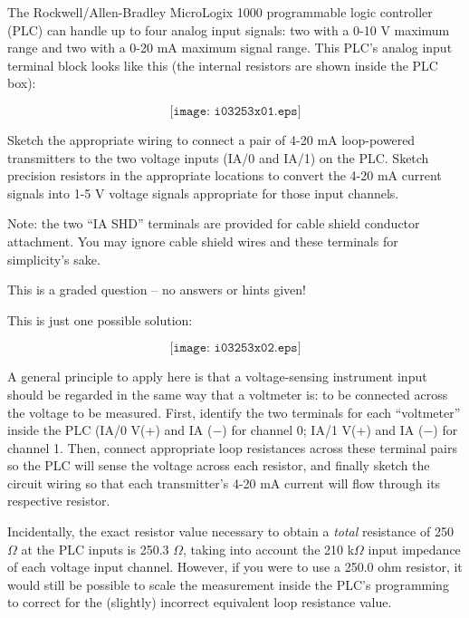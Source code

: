 

The Rockwell/Allen-Bradley MicroLogix 1000 programmable logic controller (PLC) can handle up to four analog input signals: two with a 0-10 V maximum range and two with a 0-20 mA maximum signal range.  This PLC's analog input terminal block looks like this (the internal resistors are shown inside the PLC box):

$$\texttt{[image: i03253x01.eps]}$$

Sketch the appropriate wiring to connect a pair of 4-20 mA loop-powered transmitters to the two voltage inputs (IA/0 and IA/1) on the PLC.  Sketch precision resistors in the appropriate locations to convert the 4-20 mA current signals into 1-5 V voltage signals appropriate for those input channels.

\vfil 

Note: the two ``IA SHD'' terminals are provided for cable shield conductor attachment.  You may ignore cable shield wires and these terminals for simplicity's sake.

\eject






This is a graded question -- no answers or hints given!
 






This is just one possible solution:

$$\texttt{[image: i03253x02.eps]}$$

A general principle to apply here is that a voltage-sensing instrument input should be regarded in the same way that a voltmeter is: to be connected across the voltage to be measured.  First, identify the two terminals for each ``voltmeter'' inside the PLC (IA/0 V(+) and IA ($-$) for channel 0; IA/1 V(+) and IA ($-$) for channel 1.  Then, connect appropriate loop resistances across these terminal pairs so the PLC will sense the voltage across each resistor, and finally sketch the circuit wiring so that each transmitter's 4-20 mA current will flow through its respective resistor.

Incidentally, the exact resistor value necessary to obtain a {\it total} resistance of 250 $\Omega$ at the PLC inputs is 250.3 $\Omega$, taking into account the 210 k$\Omega$ input impedance of each voltage input channel.  However, if you were to use a 250.0 ohm resistor, it would still be possible to scale the measurement inside the PLC's programming to correct for the (slightly) incorrect equivalent loop resistance value.




